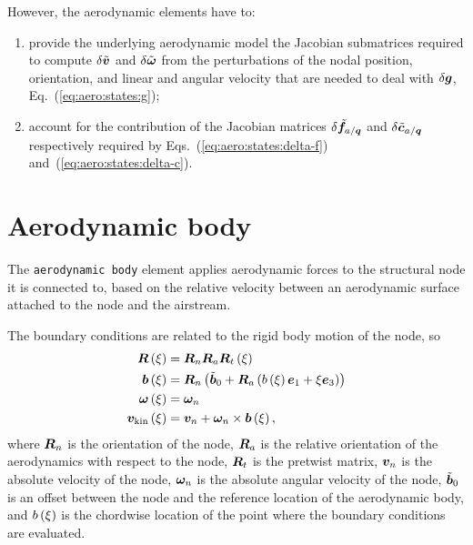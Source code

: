 However, the aerodynamic elements have to:
\begin{enumerate}

\item provide the underlying aerodynamic model the Jacobian submatrices
required to compute $\delta\tilde{\bm{v}}$ and $\delta\tilde{\bm{\omega}}$
from the perturbations of the nodal position, orientation,
and linear and angular velocity that are needed to deal with $\delta\bm{g}$,
Eq.~(\ref{eq:aero:states:g});

\item account for the contribution of the Jacobian matrices
$\delta\tilde{\bm{f}}_{a/\bm{q}}$ and $\delta\tilde{\bm{c}}_{a/\bm{q}}$
respectively required by Eqs.~(\ref{eq:aero:states:delta-f})
and~(\ref{eq:aero:states:delta-c}).

\end{enumerate}




\section{Aerodynamic body}
The \texttt{aerodynamic body} element applies aerodynamic forces
to the structural node it is connected to,
based on the relative velocity between an aerodynamic surface attached 
to the node and the airstream.

The boundary conditions are related to the rigid body motion
of the node, so
\begin{subequations}
\begin{align}
	\bm{R}\left( \xi \right)
	&=
	\bm{R}_n \bm{R}_a \bm{R}_t\left( \xi \right)
	\\
	\bm{b}\left( \xi \right)
	&=
	\bm{R}_n\left( 
		\tilde{\bm{b}}_0
		+ \bm{R}_a \left( 
			b\left( \xi \right) \bm{e}_1
			+ \xi \bm{e}_3
		 \right)
	 \right)
	\\
	\bm{\omega}\left( \xi \right)
	&=
	\bm{\omega}_n
	\\
	\bm{v}_{\text{kin}}\left( \xi \right)
	&=
	\bm{v}_n + \bm{\omega}_n \times \bm{b}\left( \xi \right)
	,
\end{align}
\end{subequations}
where
$\bm{R}_n$ is the orientation of the node,
$\bm{R}_a$ is the relative orientation of the aerodynamics
with respect to the node,
$\bm{R}_t$ is the pretwist matrix,
$\bm{v}_n$ is the absolute velocity of the node,
$\bm{\omega}_n$ is the absolute angular velocity of the node,
$\tilde{\bm{b}}_0$ is an offset between the node and the reference location
of the aerodynamic body,
and $b\left( \xi \right)$ is the chordwise location of the point
where the boundary conditions are evaluated.

